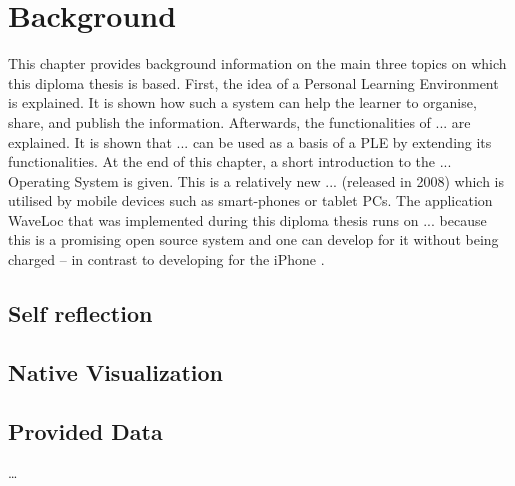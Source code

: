 \chapter{Background}
\label{cha:background}


This chapter provides background information on the main three topics on which this diploma thesis is based. First, the idea of a Personal Learning Environment is explained. It is shown how such a system can help the learner to organise, share, and publish the information. Afterwards, the functionalities of ... are explained. It is shown that ... can be used as a basis of a PLE by extending its functionalities. At the end of this chapter, a short introduction to the ... Operating System is given. This is a relatively new ... (released in 2008) which is utilised by mobile devices such as smart-phones or tablet PCs. The application WaveLoc that was implemented during this diploma thesis runs on ... because this is a promising \cite{canalysandroid} open source system and one can develop for it without being charged -- in contrast to developing for the iPhone \cite{iphonedev}.


\section{Self reflection}

\section{Native Visualization}

\section{Provided Data}
\label{sec:background__personal_learning_environment}

\ldots{}